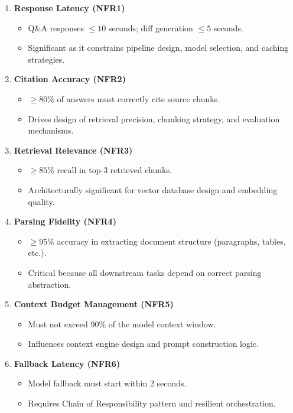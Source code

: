 \documentclass[12pt]{article}
\begin{document}
\begin{enumerate}
   \item \textbf{Response Latency (NFR1)}
   \begin{itemize}
      \item Q\&A responses $\leq 10$ seconds; diff generation $\leq 5$ seconds.
      \item Significant as it constrains pipeline design, model selection, and caching strategies.
   \end{itemize}

   \item \textbf{Citation Accuracy (NFR2)}
   \begin{itemize}
      \item $\geq 80\%$ of answers must correctly cite source chunks.
      \item Drives design of retrieval precision, chunking strategy, and evaluation mechanisms.
   \end{itemize}

   \item \textbf{Retrieval Relevance (NFR3)}
   \begin{itemize}
      \item $\geq 85\%$ recall in top-3 retrieved chunks.
      \item Architecturally significant for vector database design and embedding quality.
   \end{itemize}

   \item \textbf{Parsing Fidelity (NFR4)}
   \begin{itemize}
      \item $\geq 95\%$ accuracy in extracting document structure (paragraphs, tables, etc.).
      \item Critical because all downstream tasks depend on correct parsing abstraction.
   \end{itemize}

   \item \textbf{Context Budget Management (NFR5)}
   \begin{itemize}
      \item Must not exceed $90\%$ of the model context window.
      \item Influences context engine design and prompt construction logic.
   \end{itemize}

   \item \textbf{Fallback Latency (NFR6)}
   \begin{itemize}
      \item Model fallback must start within 2 seconds.
      \item Requires Chain of Responsibility pattern and resilient orchestration.
   \end{itemize}
\end{enumerate}
\end{document}
